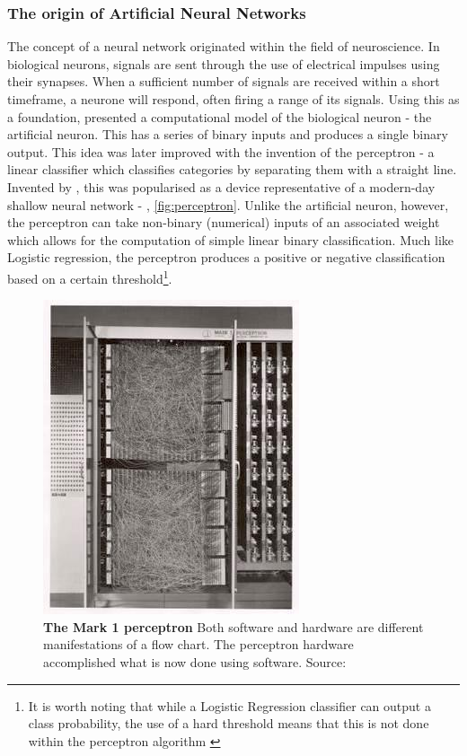 \subsubsection{The origin of Artificial Neural Networks}
The concept of a neural network originated within the field of neuroscience. In biological neurons, signals are sent through the use of electrical impulses using their synapses. When a sufficient number of signals are received within a short timeframe, a neurone will respond, often firing a range of its signals. Using this as a foundation,\cite{pitts} presented a computational model of the biological neuron - the artificial neuron. This has a series of binary inputs and produces a single binary output. This idea was later improved with the invention of the perceptron - a linear classifier which classifies categories by separating them with a straight line. Invented by \cite{perceptron}, this was popularised as a device representative of a modern-day shallow neural network - \citep{perceptronmanual}, \autoref{fig:perceptron}. Unlike the artificial neuron, however, the perceptron can take non-binary (numerical) inputs of an associated weight which allows for the computation of simple linear binary classification. Much like Logistic regression, the perceptron produces a positive or negative classification based on a certain threshold\footnote{It is worth noting that while a Logistic Regression classifier can output a class probability, the use of a hard threshold means that this is not done within the perceptron algorithm \citep{handsonml}}. 


\begin{figure}[H]
     \centering
         \includegraphics[width=.45\textwidth]{figures_c3/mlpregressor/Mark_I_perceptron.jpg}
        \caption{\textbf{The Mark 1 perceptron} Both software and hardware are different manifestations of a flow chart. The perceptron hardware accomplished what is now done using software. Source: \cite{perceptronimage}}
        \label{fig:perceptron}
\end{figure}

